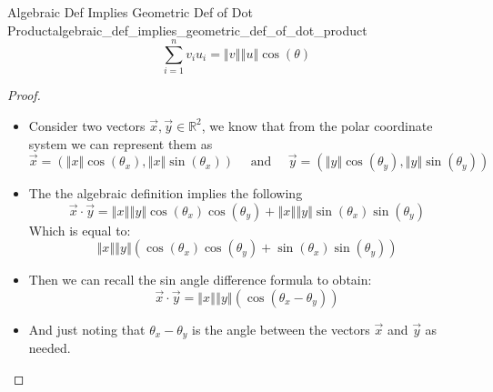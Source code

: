 \begin{proposition}{Algebraic Def Implies Geometric Def of Dot Product}{algebraic_def_implies_geometric_def_of_dot_product}
    \[
	 \sum_{i=1}^{n} v_{i} u_{i} =  \left\Vert v \right\Vert \left\Vert u \right\Vert \cos  \left( \theta \right) 
    \]
\end{proposition}

\begin{proof}
    \begin{itemize}
        \item Consider two vectors $ \vec{x}, \vec{y} \in \mathbb{R} ^{2}$, we know that from the polar coordinate system we can represent them as
            \[
            \vec{x} =  \left( \left\Vert x \right\Vert \cos  \left( \theta _{x} \right), \left\Vert x \right\Vert \sin  \left( \theta _{x} \right)  \right) \quad \text{ and } \quad \vec{y} =  \left( \left\Vert y \right\Vert \cos  \left( \theta _{y} \right), \left\Vert y \right\Vert \sin  \left( \theta _{y} \right)  \right)    
            \]
        \item The the algebraic definition implies the following
            \[
            \vec{x}  \cdot  \vec{y} =  \left\Vert x \right\Vert \left\Vert y \right\Vert \cos  \left( \theta _{x} \right) \cos  \left( \theta _{y} \right)  +  \left\Vert x \right\Vert \left\Vert y \right\Vert \sin  \left( \theta  _{x} \right) \sin  \left( \theta _{y} \right) 
            \]
            Which is equal to:
            \[
            \left\Vert x \right\Vert \left\Vert y \right\Vert \left( \cos  \left( \theta  _{x} \right) \cos  \left( \theta  _{y} \right)  +  \sin  \left( \theta _{x} \right) \sin  \left( \theta _{y} \right) \right)
            \]
        \item Then we can recall the sin angle difference formula to obtain: 
            \[
            \vec{x}  \cdot  \vec{y} = \left\Vert x \right\Vert \left\Vert y \right\Vert \left( \cos  \left( \theta_{x}  -  \theta _{y} \right) \right)
            \]
        \item And just noting that $ \theta _{x}  -  \theta _{y}$ is the angle between the vectors $ \vec{x}$ and $ \vec{y}$ as needed.
    \end{itemize}
\end{proof}
